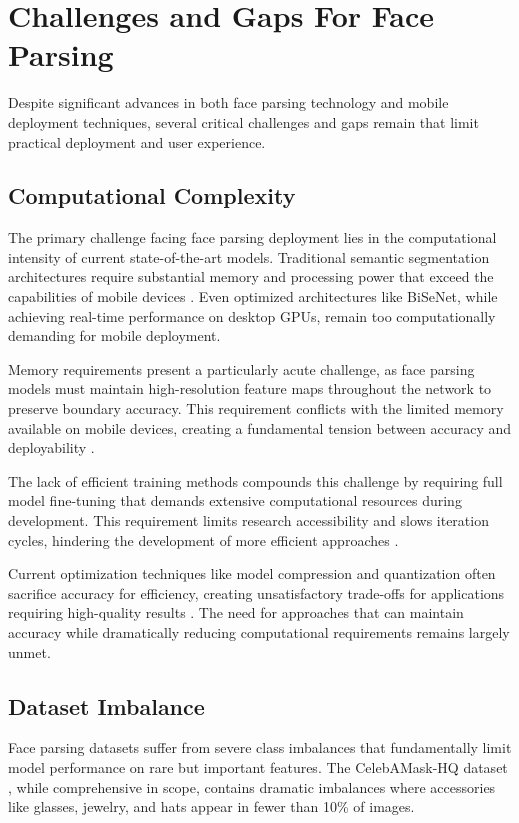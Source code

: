 \documentclass[12pt,a4paper]{report}
\begin{document}
\section{Challenges and Gaps For Face Parsing}

Despite significant advances in both face parsing technology and mobile deployment techniques, several critical challenges and gaps remain that limit practical deployment and user experience.

\subsection{Computational Complexity}

The primary challenge facing face parsing deployment lies in the computational intensity of current state-of-the-art models. Traditional semantic segmentation architectures require substantial memory and processing power that exceed the capabilities of mobile devices \cite{yu2018bisenet}. Even optimized architectures like BiSeNet, while achieving real-time performance on desktop GPUs, remain too computationally demanding for mobile deployment.

Memory requirements present a particularly acute challenge, as face parsing models must maintain high-resolution feature maps throughout the network to preserve boundary accuracy. This requirement conflicts with the limited memory available on mobile devices, creating a fundamental tension between accuracy and deployability \cite{chen2018encoder}.

The lack of efficient training methods compounds this challenge by requiring full model fine-tuning that demands extensive computational resources during development. This requirement limits research accessibility and slows iteration cycles, hindering the development of more efficient approaches \cite{smith2017cyclical}.

Current optimization techniques like model compression and quantization often sacrifice accuracy for efficiency, creating unsatisfactory trade-offs for applications requiring high-quality results \cite{jacob2018quantization}. The need for approaches that can maintain accuracy while dramatically reducing computational requirements remains largely unmet.

\subsection{Dataset Imbalance}

Face parsing datasets suffer from severe class imbalances that fundamentally limit model performance on rare but important features. The CelebAMask-HQ dataset \cite{lee2020maskgan}, while comprehensive in scope, contains dramatic imbalances where accessories like glasses, jewelry, and hats appear in fewer than 10\% of images.
\end{document}
